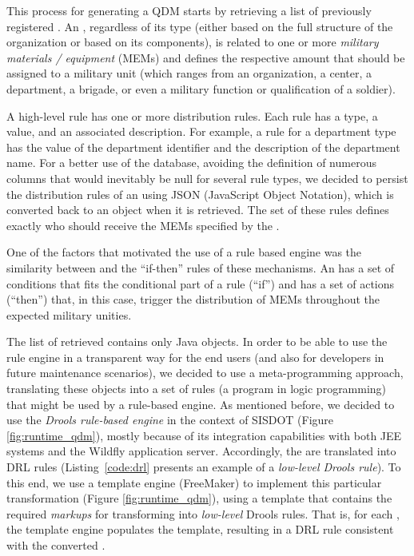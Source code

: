 This process for generating a QDM starts by retrieving a list of previously registered \callers. An \shc, regardless of its type (either based on the full structure of the organization or based on its components), is related to one or more \emph{military materials / equipment} (MEMs) and defines the respective amount that should be assigned to a military unit (which ranges from an organization, a center, a department, a brigade, or even a military function or qualification of a soldier). 

A high-level rule has one or more distribution rules. Each rule has a type, a value, and an associated description. For example, a rule for a department type has the value of the department identifier and the description of the department name. For a better use of the database, avoiding the definition of numerous columns that would inevitably be null for several rule types, we decided to persist the distribution rules of an \shc using JSON (JavaScript Object Notation), which is converted back to an object when it is retrieved. The set of these rules defines exactly who should receive the MEMs specified by the \shc.

One of the factors that motivated the use of a rule based engine was the similarity between \callers and the ``if-then'' rules of these mechanisms.  %
An \shc has a set of conditions that fits the conditional part of a rule (``if'') and has a set of actions (``then'') that, in this case, trigger the distribution of MEMs throughout the expected military unities.

The list of retrieved \callers contains only Java objects. In order to be able to use the rule engine in a transparent way for the end users (and also for developers in future maintenance scenarios), we decided to use a meta-programming approach, translating these objects into a set of rules (a program in logic programming) that might be used by a rule-based engine. As mentioned before, we decided to use the \emph{Drools rule-based engine} in the context of SISDOT (Figure \ref{fig:runtime_qdm}), mostly because of its integration capabilities with both JEE systems and the Wildfly application server. Accordingly, the \callers are translated into DRL rules (Listing~\ref{code:drl} presents an example of a \emph{low-level Drools rule}). To this end, we use a template engine (FreeMaker) to implement this particular transformation (Figure \ref{fig:runtime_qdm}), using a template that contains the required \emph{markups} for transforming \shc into \emph{low-level} Drools rules. That is, for each \shc, the template engine populates the template, resulting in a DRL rule consistent with the converted \shc.

